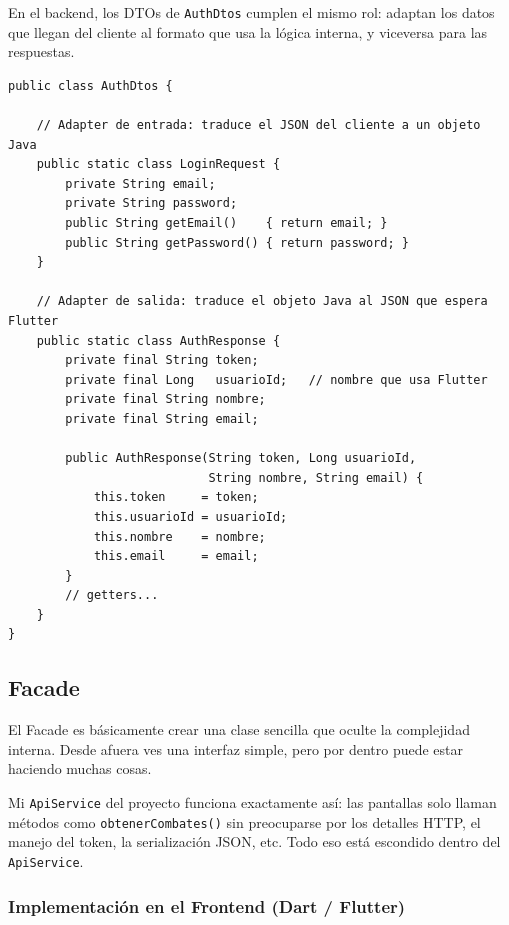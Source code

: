 \documentclass{article}
\begin{document}
En el backend, los DTOs de \texttt{AuthDtos} cumplen el mismo rol: adaptan
los datos que llegan del cliente al formato que usa la l\'ogica interna, y
viceversa para las respuestas.
 
\begin{lstlisting}[style=javaStyle, caption={Adapter entre capas con DTOs (dto/AuthDtos.java -- fragmento)}]
public class AuthDtos {
 
    // Adapter de entrada: traduce el JSON del cliente a un objeto Java
    public static class LoginRequest {
        private String email;
        private String password;
        public String getEmail()    { return email; }
        public String getPassword() { return password; }
    }
 
    // Adapter de salida: traduce el objeto Java al JSON que espera Flutter
    public static class AuthResponse {
        private final String token;
        private final Long   usuarioId;   // nombre que usa Flutter
        private final String nombre;
        private final String email;
 
        public AuthResponse(String token, Long usuarioId,
                            String nombre, String email) {
            this.token     = token;
            this.usuarioId = usuarioId;
            this.nombre    = nombre;
            this.email     = email;
        }
        // getters...
    }
}
\end{lstlisting}
 
\subsection{Facade}
 
El Facade es b\'asicamente crear una clase sencilla que oculte la complejidad
interna. Desde afuera ves una interfaz simple, pero por dentro puede estar
haciendo muchas cosas.
 
Mi \texttt{ApiService} del proyecto funciona exactamente as\'i: las pantallas
solo llaman m\'etodos como \texttt{obtenerCombates()} sin preocuparse por los
detalles HTTP, el manejo del token, la serializaci\'on JSON, etc. Todo eso
est\'a escondido dentro del \texttt{ApiService}.
 
\subsubsection*{Implementaci\'on en el Frontend (Dart / Flutter)}
 
\end{document}
